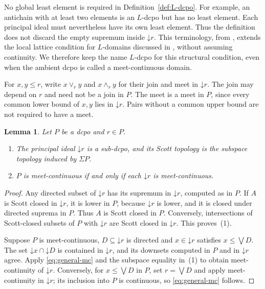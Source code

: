 \documentclass[10pt,a4paper]{amsart}
\newtheorem{lemma}[theorem]{Lemma}
\numberwithin{equation}{section}
\newcommand{\down}[1]{\mathord{\downarrow}#1}
\newcommand{\Sig}{\Sigma}
\newcommand{\mc}{\wedge}
\newcommand{\jc}{\vee}
\begin{document}
No global least element is required in Definition~\ref{def:L-dcpo}. For example, an antichain with at least two elements is an $L$-dcpo but has no least element. Each principal ideal must nevertheless have its own least element. Thus the definition does not discard the empty supremum inside $\down r$. This terminology, from \cite{JiaJungLi}, extends the local lattice condition for $L$-domains discussed in \cite[Section~4.1]{AbramskyJung}, without assuming continuity. We therefore keep the name $L$-dcpo for this structural condition, even when the ambient dcpo is called a meet-continuous domain.

For $x,y\le r$, write $x\jc_r y$ and $x\mc_r y$ for their join and meet in $\down r$. The join may depend on $r$ and need not be a join in $P$. The meet is a meet in $P$, since every common lower bound of $x,y$ lies in $\down r$. Pairs without a common upper bound are not required to have a meet.

\begin{lemma}\label{lem:principal-localization}
Let $P$ be a dcpo and $r\in P$.
\begin{enumerate}[label=\textup{(\arabic*)}]
\item The principal ideal $\down r$ is a sub-dcpo, and its Scott topology is the subspace topology induced by $\Sig P$.
\item $P$ is meet-continuous if and only if each $\down r$ is meet-continuous.
\end{enumerate}
\end{lemma}
\begin{proof}
Any directed subset of $\down r$ has its supremum in $\down r$, computed as in $P$. If $A$ is Scott closed in $\down r$, it is lower in $P$, because $\down r$ is lower, and it is closed under directed suprema in $P$. Thus $A$ is Scott closed in $P$. Conversely, intersections of Scott-closed subsets of $P$ with $\down r$ are Scott closed in $\down r$. This proves~(1).

Suppose $P$ is meet-continuous, $D\subseteq \down r$ is directed and $x\in \down r$ satisfies $x\le\bigvee D$. The set $\down x\cap\down D$ is contained in $\down r$, and its downsets computed in $P$ and in $\down r$ agree. Apply \eqref{eq:general-mc} and the subspace equality in~(1) to obtain meet-continuity of $\down r$. Conversely, for $x\le\bigvee D$ in $P$, set $r=\bigvee D$ and apply meet-continuity in $\down r$; its inclusion into $P$ is continuous, so \eqref{eq:general-mc} follows.
\end{proof}
\end{document}

